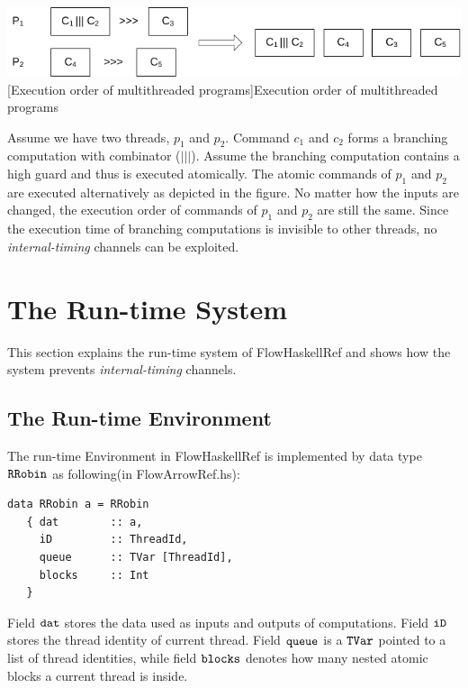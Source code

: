 \documentclass[a4paper]{report}
\newcommand{\co}[1]{$\cod{#1}$}
\begin{document}
\begin{center}
\includegraphics[scale=0.9]{multi.pdf} \\
[Execution order of multithreaded programs]{Execution order of multithreaded programs}
\end{center}

Assume we have two threads, $p_1$ and $p_2$. Command $c_1$ and $c_2$ forms a branching computation with combinator
($|||$). Assume the branching computation contains a high guard and thus is executed atomically.
The atomic commands of $p_1$ and $p_2$ are executed alternatively as depicted in the figure.
No matter how the inputs are changed, the execution order of commands of $p_1$ and $p_2$ are still the same.
Since the execution time of branching computations is invisible to other threads, no {\em internal-timing}
channels can be exploited.


\section{The Run-time System}
\label{chap7:runtime}

This section explains the run-time system of FlowHaskellRef
and shows how the system prevents {\em internal-timing} channels.

\subsection{The Run-time Environment}
The run-time Environment in FlowHaskellRef is implemented by data type \co{RRobin} 
as following(in FlowArrowRef.hs):
\begin{Verbatim}[fontsize=\footnotesize]
data RRobin a = RRobin 
   { dat        :: a,                    
     iD         :: ThreadId,        
     queue      :: TVar [ThreadId],      
     blocks     :: Int                   
   }
\end{Verbatim}
Field \co{dat} stores the data used as inputs and outputs of computations. 
Field \co{iD} stores the thread identity of current thread. 
Field \co{queue} is a \co{TVar} pointed to a list of thread identities, while
field \co{blocks} denotes how many nested atomic blocks a current thread is inside.
\end{document}
